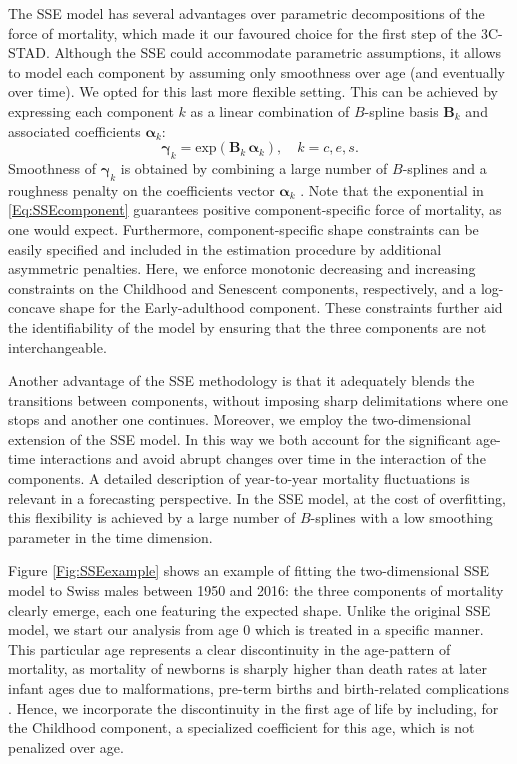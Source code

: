 \documentclass[11pt, a4paper]{article}
\begin{document}
The SSE model has several advantages over parametric decompositions of the force of mortality, which made it our favoured choice for the first step of the 3C-STAD. Although the SSE could accommodate parametric assumptions, it allows to model each component by assuming only smoothness over age (and eventually over time). We opted for this last more flexible setting. This can be achieved by expressing each component $k$ as a linear combination of $B$-spline basis $\bm{B}_k$ and associated coefficients $\bm{\alpha}_k$: 
\begin{equation}\label{Eq:SSEcomponent}
\bm{\gamma}_k = \mathrm{exp} \left( \bm{B}_k\,\bm{\alpha}_k\right), \quad k=c,e,s. 
\end{equation}
Smoothness of $\bm{\gamma}_k$ is obtained by combining a large number of $B$-splines and a roughness penalty on the coefficients vector $\bm{\alpha}_k$ \citep{eilers1996flexible}. Note that the exponential in \eqref{Eq:SSEcomponent} guarantees positive component-specific force of mortality, as one would expect. Furthermore, component-specific shape constraints can be easily specified and included in the estimation procedure by additional asymmetric penalties. Here, we enforce monotonic decreasing and increasing constraints on the Childhood and Senescent components, respectively, and a log-concave shape for the Early-adulthood component. These constraints further aid the identifiability of the model by ensuring that the three components are not interchangeable.

Another advantage of the SSE methodology is that it adequately blends the transitions between components, without imposing sharp delimitations where one stops and another one continues. Moreover, we employ the two-dimensional extension of the SSE model. In this way we both account for the significant age-time interactions and avoid abrupt changes over time in the interaction of the components. A detailed description of year-to-year mortality fluctuations is relevant in a forecasting perspective. In the SSE model, at the cost of overfitting, this flexibility is achieved by a large number of $B$-splines with a low smoothing parameter in the time dimension.

Figure \ref{Fig:SSEexample} shows an example of fitting the two-dimensional SSE model to Swiss males between 1950 and 2016: the three components of mortality clearly emerge, each one featuring the expected shape. Unlike the original SSE model, we start our analysis from age 0 which is treated in a specific manner. This particular age represents a clear discontinuity in the age-pattern of mortality, as mortality of newborns is sharply higher than death rates at later infant ages due to malformations, pre-term births and birth-related complications \citep{chiang1984life,camarda2016sums}. Hence, we incorporate the discontinuity in the first age of life by including, for the Childhood component, a specialized coefficient for this age, which is not penalized over age. 
\end{document}
